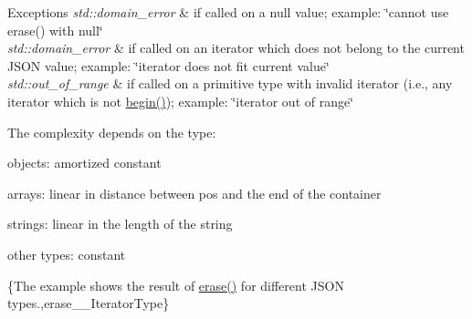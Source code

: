\begin{DoxyExceptions}{Exceptions}
{\em std\-::domain\-\_\-error} & if called on a {\ttfamily null} value; example\-: {\ttfamily \char`\"{}cannot use
erase() with null\char`\"{}} \\
\hline
{\em std\-::domain\-\_\-error} & if called on an iterator which does not belong to the current J\-S\-O\-N value; example\-: {\ttfamily \char`\"{}iterator does not fit current value\char`\"{}} \\
\hline
{\em std\-::out\-\_\-of\-\_\-range} & if called on a primitive type with invalid iterator (i.\-e., any iterator which is not {\ttfamily \hyperlink{classnlohmann_1_1basic__json_ad4e381c54039607be08d7af41a1f6ad1}{begin()}}); example\-: {\ttfamily \char`\"{}iterator
out of range\char`\"{}}\\
\hline
\end{DoxyExceptions}
The complexity depends on the type\-:
\begin{DoxyItemize}
\item objects\-: amortized constant
\item arrays\-: linear in distance between pos and the end of the container
\item strings\-: linear in the length of the string
\item other types\-: constant
\end{DoxyItemize}

\{The example shows the result of {\ttfamily \hyperlink{classnlohmann_1_1basic__json_a45e789042a23138eba2b69f34df9fc45}{erase()}} for different J\-S\-O\-N types.,erase\-\_\-\-\_\-\-Iterator\-Type\}


